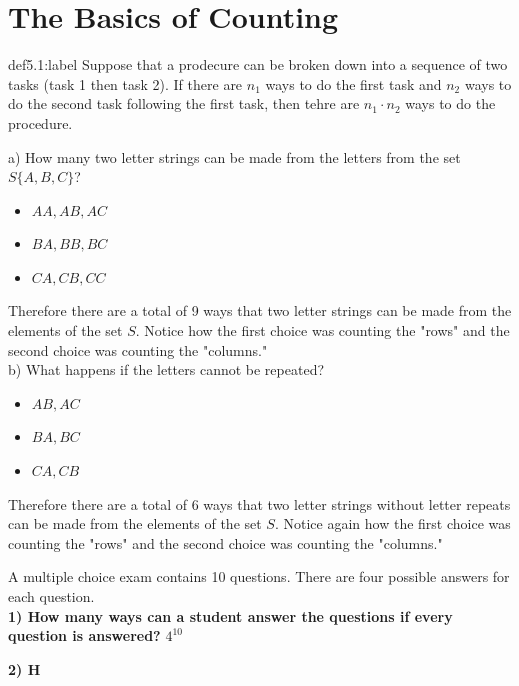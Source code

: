 \section{The Basics of Counting}

\begin{definition}{def5.1:label}
    Suppose that a prodecure can be broken down into a sequence of two tasks (task 1 then task 2). If there are $n_1$ ways to do the first task and $n_2$ ways to do the second task following the first task, then tehre are $n_1\cdot n_2$ ways to do the procedure.
\end{definition}

\begin{problem}
    a) How many two letter strings can be made from the letters from the set $S \{A,B,C\}$?\\

    \begin{itemize}
        \item $AA,AB,AC$
        \item $BA,BB,BC$
        \item $CA,CB,CC$
    \end{itemize}

    Therefore there are a total of 9 ways that two letter strings can be made from the elements of the set $S$. Notice how the first choice was counting the "rows" and the second choice was counting the "columns."\\

    b) What happens if the letters cannot be repeated?

    \begin{itemize}
        \item $AB,AC$
        \item $BA,BC$
        \item $CA,CB$
    \end{itemize}

    Therefore there are a total of 6 ways that two letter strings without letter repeats can be made from the elements of the set $S$. Notice again how the first choice was counting the "rows" and the second choice was counting the "columns."
\end{problem}

\begin{problem}
    A multiple choice exam contains 10 questions. There are four possible answers for each question.\\

    \textbf{1) How many ways can a student answer the questions if every question is answered?} $4^10$

    \textbf{2) H}
\end{problem}


